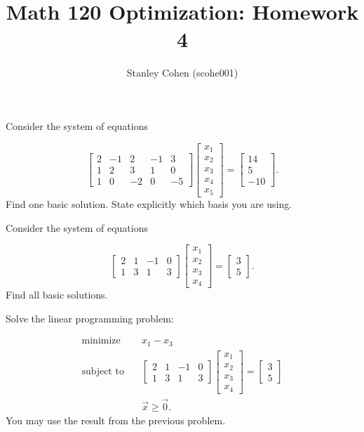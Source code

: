 \documentclass[12pt]{extarticle}
\title{Math 120 Optimization: Homework 4}
\author{Stanley Cohen (scohe001)}
\date{}
\theoremstyle{definition}
\begin{document}
\maketitle

\begin{problem} Consider the system of equations 

	\[\begin{bmatrix}
	2&-1&2&-1&3\\1&2&3&1&0\\1&0&-2&0&-5
	\end{bmatrix}\begin{bmatrix}
	x_1\\x_2\\x_3\\x_4\\x_5
	\end{bmatrix}=\begin{bmatrix}
	14\\5\\-10
	\end{bmatrix}.\]
	Find one basic solution. State explicitly which basis you are using.

\end{problem}

\begin{problem} Consider the system of equations 

	\[\begin{bmatrix}
	2&1&-1&0\\1&3&1&3
	\end{bmatrix}\begin{bmatrix}
	x_1\\x_2\\x_3\\x_4
	\end{bmatrix}=\begin{bmatrix}
	3\\5
	\end{bmatrix}.\]
	Find all basic solutions. 

\end{problem}

\begin{problem} Solve the linear programming problem:

	\begin{align*}
	\text{minimize } \quad &x_1-x_3\\
	\text{subject to} \quad & \begin{bmatrix}
	2&1&-1&0\\1&3&1&3
	\end{bmatrix}\begin{bmatrix}
	x_1\\x_2\\x_3\\x_4
	\end{bmatrix}=\begin{bmatrix}
	3\\5
	\end{bmatrix}\\
	& \vec{x}\geq \vec{0}.
	\end{align*}
	You may use the result from the previous problem.

\end{problem}
\end{document}
